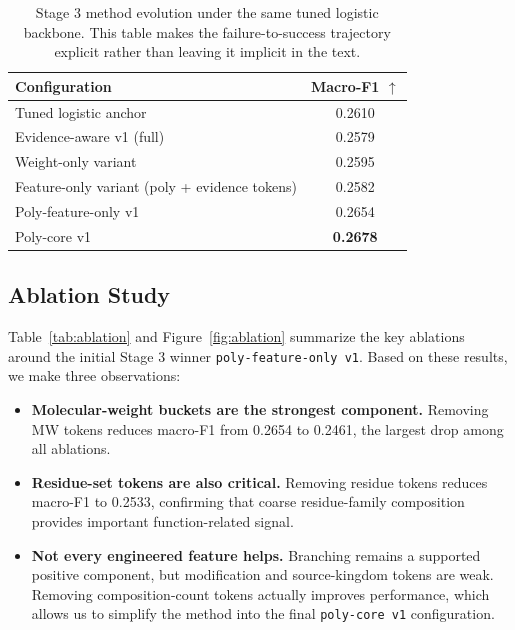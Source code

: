 \documentclass{article}
\newcommand{\best}[1]{\textcolor{bestred}{\textbf{#1}}}
\begin{document}
\begin{table}[t]
\centering
\caption{Stage 3 method evolution under the same tuned logistic backbone. This table makes the failure-to-success trajectory explicit rather than leaving it implicit in the text.}
\label{tab:stage3_evolution}
\begin{tabular}{lc}
\toprule
Configuration & Macro-F1 $\uparrow$ \\
\midrule
Tuned logistic anchor & 0.2610 \\
Evidence-aware v1 (full) & 0.2579 \\
Weight-only variant & 0.2595 \\
Feature-only variant (poly + evidence tokens) & 0.2582 \\
Poly-feature-only v1 & 0.2654 \\
Poly-core v1 & \best{0.2678} \\
\bottomrule
\end{tabular}
\end{table}

\subsection{Ablation Study}

Table~\ref{tab:ablation} and Figure~\ref{fig:ablation} summarize the key ablations around the initial Stage 3 winner \texttt{poly-feature-only v1}. Based on these results, we make three observations:
\begin{itemize}[leftmargin=*,nosep]
\item \textbf{Molecular-weight buckets are the strongest component.} Removing MW tokens reduces macro-F1 from 0.2654 to 0.2461, the largest drop among all ablations.
\item \textbf{Residue-set tokens are also critical.} Removing residue tokens reduces macro-F1 to 0.2533, confirming that coarse residue-family composition provides important function-related signal.
\item \textbf{Not every engineered feature helps.} Branching remains a supported positive component, but modification and source-kingdom tokens are weak. Removing composition-count tokens actually improves performance, which allows us to simplify the method into the final \texttt{poly-core v1} configuration.
\end{itemize}
\end{document}
